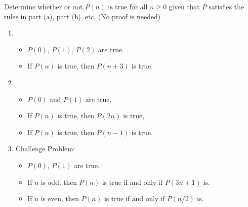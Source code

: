 Determine whether or not $P(n)$ is true for all $n \geq 0$ given that $P$ satisfies the rules in part (a), part (b), etc. (No proof is needed)

\begin{enumerate}
    \item \begin{itemize}
        \item $P(0)$, $P(1)$, $P(2)$ are true.
        \item If $P(n)$ is true, then $P(n + 3)$ is true.
    \end{itemize}

    \item \begin{itemize}
        \item $P(0)$ and $P(1)$ are true,
        \item If $P(n)$ is true, then $P(2n)$ is true,
        \item If $P(n)$ is true, then $P(n-1)$ is true.
    \end{itemize}
    
    \item Challenge Problem: \begin{itemize}
        \item $P(0)$, $P(1)$ are true.
        \item If $n$ is odd, then $P(n)$ is true if and only if $P(3n + 1)$ is.
        \item If $n$ is even, then $P(n)$ is true if and only if $P(n/2)$ is.
    \end{itemize}
\end{enumerate}